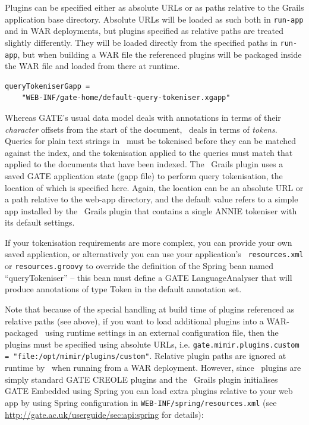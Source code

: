 Plugins can be specified either as absolute URLs or as paths relative to the
Grails application base directory.  Absolute URLs will be loaded as such both
in {\tt run-app} and in WAR deployments, but plugins specified as relative
paths are treated slightly differently.  They will be loaded directly from the
specified paths in {\tt run-app}, but when building a WAR file the referenced
plugins will be packaged inside the WAR file and loaded from there at runtime.

\begin{lstlisting}
queryTokeniserGapp = 
    "WEB-INF/gate-home/default-query-tokeniser.xgapp"
\end{lstlisting}

Whereas GATE's usual data model deals with annotations in terms of their {\em
character} offsets from the start of the document, \Mimir\ deals in terms of
{\em tokens}.  Queries for plain text strings in \Mimir\ must be tokenised
before they can be matched against the index, and the tokenisation applied to
the queries must match that applied to the documents that have been indexed.
The \Mimir\ Grails plugin uses a saved GATE application state (gapp file) to
perform query tokenisation, the location of which is specified here.  Again,
the location can be an absolute URL or a path relative to the web-app
directory, and the default value refers to a simple app installed by the
\Mimir\ Grails plugin that contains a single ANNIE tokeniser with its default
settings.

If your tokenisation requirements are more complex, you can provide your own
saved application, or alternatively you can use your application's {\tt
resources.xml} or {\tt resources.groovy} to override the definition of the
Spring bean named ``queryTokeniser'' -- this bean must define a GATE
LanguageAnalyser that will produce annotations of type Token in the default
annotation set.

Note that because of the special handling at build time of plugins referenced
as relative paths (see above), if you want to load additional plugins into a
WAR-packaged \Mimir\ using runtime settings in an external configuration file,
then the plugins must be specified using absolute URLs, i.e.
{\tt gate.mimir.plugins.custom = "file:/opt/mimir/plugins/custom"}.  Relative
plugin paths are ignored at runtime by \Mimir\ when running from a WAR
deployment.  However, since \Mimir\ plugins are simply standard GATE CREOLE
plugins and the \Mimir\ Grails plugin initialises GATE Embedded using Spring
you can load extra plugins relative to your web app by using Spring
configuration in {\tt WEB-INF/spring/resources.xml} (see
\url{http://gate.ac.uk/userguide/sec:api:spring} for details):

